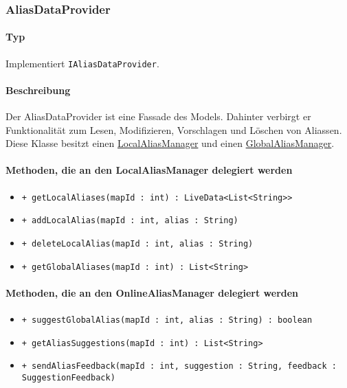 \subsubsection{AliasDataProvider}\label{App_AddAlias_AliasDataProvider}
\paragraph*{Typ}
Implementiert \texttt{IAliasDataProvider}.
\paragraph*{Beschreibung}
Der AliasDataProvider ist eine Fassade des Models. 
Dahinter verbirgt er Funktionalität zum Lesen, Modifizieren, Vorschlagen und Löschen von Aliassen.\\
Diese Klasse besitzt einen \hyperref[App_AddAlias_LocalAliasManager]{LocalAliasManager} und einen \hyperref[App_AddAlias_GlobalAliasManager]{GlobalAliasManager}.

\paragraph*{Methoden, die an den LocalAliasManager delegiert werden}
\begin{itemize}
    \item \texttt{+ getLocalAliases(mapId : int) : LiveData<List<String>>}
    \item \texttt{+ addLocalAlias(mapId : int, alias : String)}
    \item \texttt{+ deleteLocalAlias(mapId : int, alias : String)}
    \item \texttt{+ getGlobalAliases(mapId : int) : List<String>}%
\end{itemize}

\paragraph*{Methoden, die an den OnlineAliasManager delegiert werden}
\begin{itemize}
    \item \texttt{+ suggestGlobalAlias(mapId : int, alias : String) : boolean}
    \item \texttt{+ getAliasSuggestions(mapId : int) : List<String>}
    \item \texttt{+ sendAliasFeedback(mapId : int, suggestion : String, feedback : SuggestionFeedback)}
\end{itemize}
